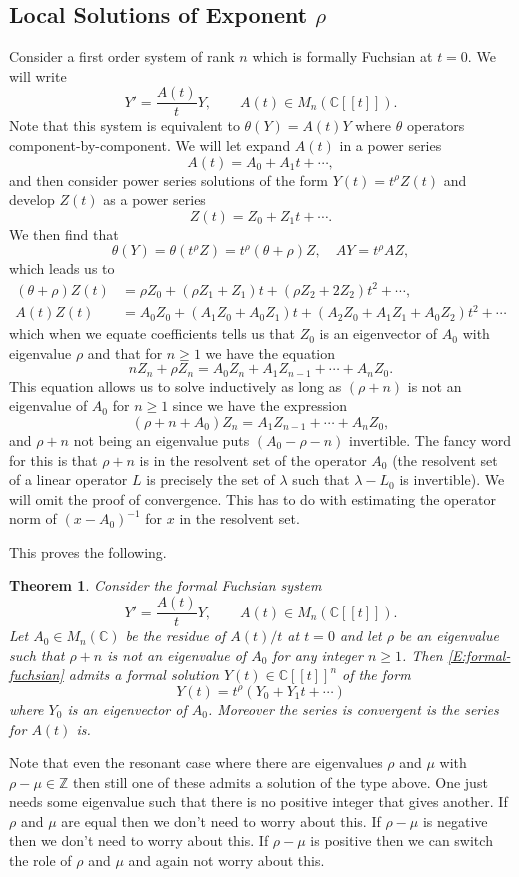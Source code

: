 \documentclass[]{book}
\numberwithin{equation}{section}
\newtheorem{theorem}{Theorem}[subsection]
\theoremstyle{definition}
\theoremstyle{remark}
\newcommand{\ZZ}{\mathbb{Z}}
\newcommand{\CC}{\mathbb{C}}
\begin{document}
\subsection{Local Solutions of Exponent $\rho$}
Consider a first order system of rank $n$ which is formally Fuchsian at $t=0$. 
We will write 
$$ Y' = \frac{A(t)}{t} Y, \qquad A(t) \in M_n(\CC[[t]]).$$
Note that this system is equivalent to $\theta(Y) = A(t) Y$ where $\theta$ operators component-by-component. 
We will let expand $A(t)$ in a power series
$$ A(t) = A_0 + A_1 t + \cdots, $$
and then consider power series solutions of the form $Y(t) = t^{\rho}Z(t)$ and develop $Z(t)$ as a power series 
$$ Z(t) = Z_0 + Z_1 t + \cdots. $$
We then find that 
$$ \theta(Y) = \theta( t^\rho Z) = t^{\rho}(\theta+\rho)Z, \quad AY =  t^\rho A Z, $$
which leads us to  
\begin{align*}
(\theta + \rho)Z(t) &= \rho Z_0 + (\rho Z_1 + Z_1)t + (\rho Z_2 + 2 Z_2)t^2 +\cdots, \\
A(t) Z(t) &= A_0 Z_0 + (A_1Z_0+A_0Z_1)t + (A_2 Z_0 + A_1Z_1+A_0 Z_2)t^2+\cdots 
\end{align*}
which when we equate coefficients tells us that $Z_0$ is an eigenvector of $A_0$ with eigenvalue $\rho$ and that for $n\geq 1$ we have the equation
$$ nZ_n + \rho Z_n = A_0 Z_n + A_1 Z_{n-1} + \cdots + A_n Z_0.$$
This equation allows us to solve inductively as long as $(\rho+n)$ is not an eigenvalue of $A_0$ for $n\geq 1$ since we have the expression
$$( \rho + n + A_0) Z_n = A_1 Z_{n-1} + \cdots + A_n Z_0,$$
and $\rho+n$ not being an eigenvalue puts $(A_0 - \rho-n)$ invertible. 
The fancy word for this is that $\rho+n$ is in the resolvent set of the operator $A_0$ (the resolvent set of a linear operator $L$ is precisely the set of $\lambda$ such that $\lambda-L_0$ is invertible). 
We will omit the proof of convergence. 
This has to do with estimating the operator norm of $(x-A_0)^{-1}$ for $x$ in the resolvent set. 

This proves the following.
\begin{theorem}
	Consider the formal Fuchsian system 
	\begin{equation}\label{E:formal-fuchsian}
	Y' = \frac{A(t)}{t} Y, \qquad A(t) \in M_n(\CC[[t]]).
	\end{equation}
	Let $A_0\in M_n(\CC)$ be the residue of $A(t)/t$ at $t=0$ and let $\rho$ be an eigenvalue such that $\rho+n$ is not an eigenvalue of $A_0$ for any integer $n\geq 1$. 
	Then \eqref{E:formal-fuchsian} admits a formal solution $Y(t) \in \CC[[t]]^n$ of the form 
	$$ Y(t) = t^{\rho}(Y_0 + Y_1 t + \cdots ) $$
	where $Y_0$ is an eigenvector of $A_0$. 
	Moreover the series is convergent is the series for $A(t)$ is. 
\end{theorem}
Note that even the resonant case where there are eigenvalues $\rho$ and $\mu$ with  $\rho-\mu \in \ZZ$ then still one of these admits a solution of the type above. 
One just needs some eigenvalue such that there is no positive integer that gives another. 
If $\rho$ and $\mu$ are equal then we don't need to worry about this. 
If $\rho-\mu$ is negative then we don't need to worry about this. 
If $\rho-\mu$ is positive then we can switch the role of $\rho$ and $\mu$ and again not worry about this. 
\end{document}
